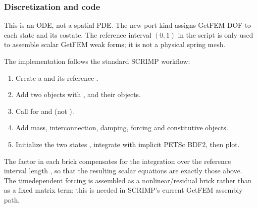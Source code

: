 \documentclass[letterpaper,10pt,english]{sphinxmanual}
\begin{document}
\subsubsection{Discretization and code}
\label{\detokenize{examples/mass_spring_damper:discretization-and-code}}
\sphinxAtStartPar
This is an ODE, not a spatial PDE. The new  port kind
assigns  GetFEM DOF to each state and its co\sphinxhyphen{}state.
The reference interval \((0,1)\) in the script is only used
to assemble scalar GetFEM weak forms; it is not a physical spring mesh.

\sphinxAtStartPar
The implementation follows the standard SCRIMP workflow:
\begin{enumerate}
%
\item {} 
\sphinxAtStartPar
Create a  and its reference .

\item {} 
\sphinxAtStartPar
Add two  objects with , and their  objects.

\item {} 
\sphinxAtStartPar
Call  for  and  (not ).

\item {} 
\sphinxAtStartPar
Add mass, interconnection, damping, forcing and constitutive  objects.

\item {} 
\sphinxAtStartPar
Initialize the two states ,
integrate with implicit PETSc BDF2, then plot.

\end{enumerate}

\sphinxAtStartPar
The factor  in each brick compensates for the integration over
the reference interval length , so that the resulting scalar
equations are exactly those above. The time\sphinxhyphen{}dependent forcing is
assembled as a nonlinear/residual brick rather than as a fixed matrix
term; this is needed in SCRIMP’s current GetFEM assembly path.
\end{document}

